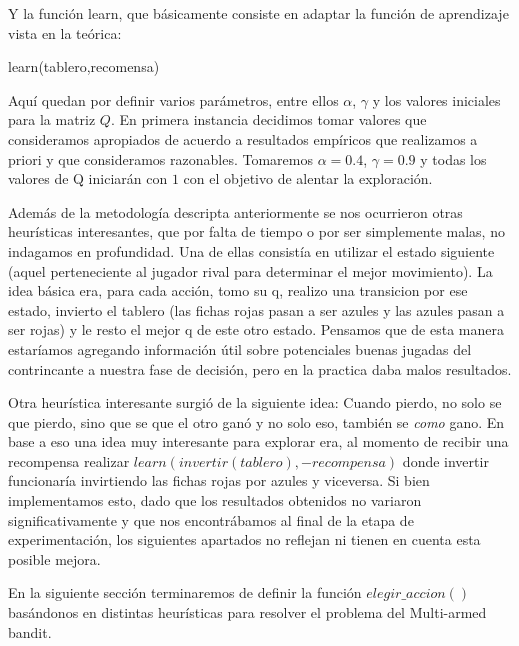 Y la función learn, que básicamente consiste en adaptar la función de aprendizaje vista en la teórica:

\begin{algorithm}[h!]
\begin{algorithmic}[1]\parskip=1mm
 \caption{learn(tablero,recomensa)}
\end{algorithmic}
\end{algorithm}

Aquí quedan por definir varios parámetros, entre ellos $\alpha$, $\gamma$ y los valores iniciales para la matriz $Q$. En primera instancia decidimos tomar valores que consideramos apropiados de acuerdo a resultados empíricos que realizamos a priori y que consideramos razonables. Tomaremos $\alpha=0.4 $, $\gamma=0.9$ y todas los valores de Q iniciarán con $1$ con el objetivo de alentar la exploración.

Además de la metodología descripta anteriormente se nos ocurrieron otras heurísticas interesantes, que por falta de tiempo o por ser simplemente malas, no indagamos en profundidad. Una de ellas consistía en utilizar el estado siguiente (aquel perteneciente al jugador rival para determinar el mejor movimiento). La idea básica era, para cada acción, tomo su q, realizo una transicion por ese estado, invierto el tablero (las fichas rojas pasan a ser azules y las azules pasan a ser rojas) y le resto el mejor q de este otro estado. Pensamos que de esta manera estaríamos agregando información útil sobre potenciales buenas jugadas del contrincante a nuestra fase de decisión, pero en la practica daba malos resultados.

Otra heurística interesante surgió de la siguiente idea: Cuando pierdo, no solo se que pierdo, sino que se que el otro ganó y no solo eso, también se \textit{como} gano. En base a eso una idea muy interesante para explorar era, al momento de recibir una recompensa realizar $learn(invertir(tablero), -recompensa)$ donde invertir funcionaría invirtiendo las fichas rojas por azules y viceversa. Si bien implementamos esto, dado que los resultados obtenidos no variaron significativamente y que nos encontrábamos al final de la etapa de experimentación, los siguientes apartados no reflejan ni tienen en cuenta esta posible mejora.

En la siguiente sección terminaremos de definir la función $elegir\_accion()$ basándonos en distintas heurísticas para resolver el problema del Multi-armed bandit.

